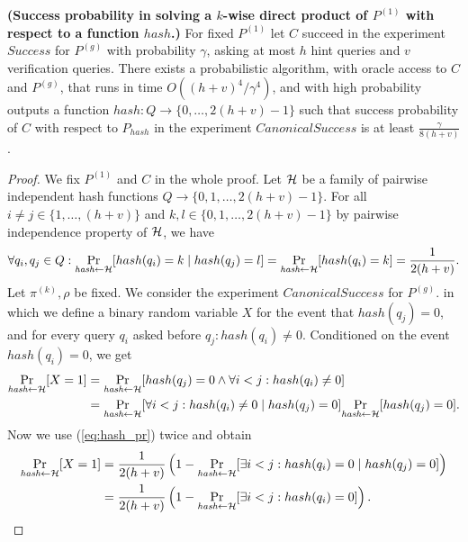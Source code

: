 %
\begin{lemma}\textbf{(Success probability in solving a $k$-wise direct product of $P^{(1)}$ with respect to a function $hash$.)}
\label{lemma:hash_function_probability}
For fixed $P^{(1)}$ let $C$ succeed in the experiment $Success$ for $P^{(g)}$ with probability $\gamma$,
asking at most $h$ hint queries and $v$ verification queries.
There exists a probabilistic algorithm, with oracle access to $C$ and $P^{(g)}$, that runs in time $O((h+v)^4/\gamma^4)$,
and with high probability outputs a function $hash: Q \rightarrow \{0, \dots, 2(h+v)-1\}$
such that success probability of $C$ with respect to $P_{hash}$ in the experiment $CanonicalSuccess$ is at least $\frac{\gamma}{8(h+v)}$.
\end{lemma}
%
\begin{proof}
We fix $P^{(1)}$ and $C$ in the whole proof.
Let $\mathcal{H}$ be a family of pairwise independent hash functions $Q \rightarrow \{0,1, \dots,2(h+v)-1\}$.
For all $i \neq j \in \{1, \dots, (h+v)\}$ and $k,l \in \{0,1,\dots,2(h+v)-1\}$ by pairwise independence property of $\mathcal{H}$,
we have
\begin{align}
  \label{eq:hash_pr}
 \forall q_i,q_j \in Q : \underset{\textit{hash} \leftarrow \mathcal{H}}{\Pr}[hash(q_i) = k \mid hash(q_j) = l] = \underset{\textit{hash} \leftarrow \mathcal{H}}{\Pr}[hash(q_i) = k] = \frac{1}{2(h+v)}.
\end{align}
Let $\pi^{(k)}, \rho$ be fixed. We consider the experiment $CanonicalSuccess$ for $P^{(g)}$.
in which we define a binary random variable $X$ for the event that $hash(q_j) = 0$, and for every query $q_i$ asked before $q_j : hash(q_i) \neq 0$.
Conditioned on the event $hash(q_i) = 0$, we get
\begin{align*}
  \underset{\textit{hash} \leftarrow \mathcal{H}}{\Pr}[X=1] &= \underset{\textit{hash} \leftarrow \mathcal{H}}{\Pr}[hash(q_j) = 0 \land \forall i < j : hash(q_i) \neq 0] \\
  &=\underset{\textit{hash} \leftarrow \mathcal{H}}{\Pr}[\forall i < j : hash(q_i) \neq 0 \mid hash(q_j) = 0] \underset{\textit{hash} \leftarrow \mathcal{H}}{\Pr}[hash(q_j) = 0].
\end{align*}
Now we use (\ref{eq:hash_pr}) twice and obtain
\begin{align*}
\underset{\textit{hash} \leftarrow \cH}{\Pr}[X=1] &=
\frac{1}{2(h+v)}\left(1 -\underset{\textit{hash} \leftarrow \cH}{\Pr}[\exists i < j : hash(q_i) = 0 \mid hash(q_j) = 0] \right) \\
 &= \frac{1}{2(h+v)} \left( 1 -\underset{\textit{hash} \leftarrow \cH}{\Pr}[\exists i < j : hash(q_i) = 0] \right).

\end{align*}
\end{proof}
